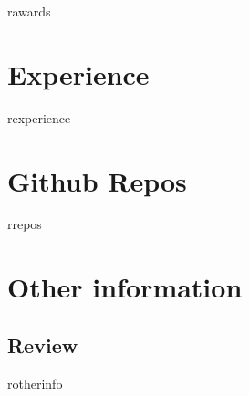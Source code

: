 \documentclass[letterpaper]{twentysecondcv} %
\begin{document}
\begin{twentyshort} %
	rawards
\end{twentyshort}


\section{Experience}

\begin{twenty} %
	rexperience
\end{twenty}


\section{Github Repos}

\begin{twenty} %
	rrepos
\end{twenty}

\section{Other information}

\subsection{Review}

rotherinfo


\end{document}
